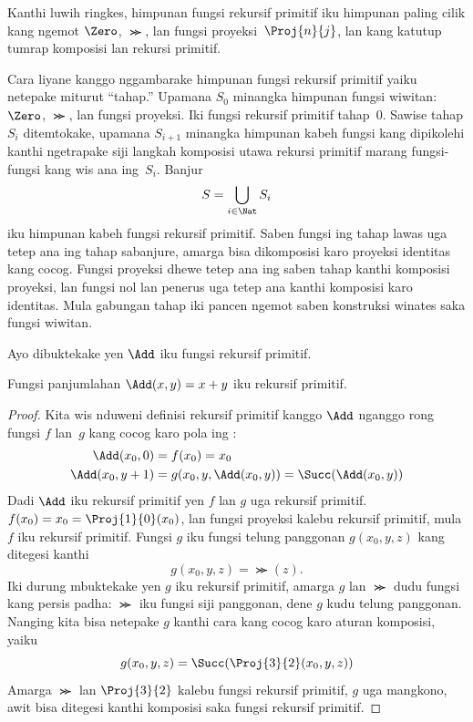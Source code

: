 \documentclass[../../../include/open-logic-section]{subfiles}
\begin{document}
\begin{explain}
Kanthi luwih ringkes, himpunan fungsi rekursif primitif iku
himpunan paling cilik kang ngemot $\Zero$, $\Succ$, lan fungsi
proyeksi~$\Proj{n}{j}$, lan kang katutup tumrap komposisi lan
rekursi primitif.

Cara liyane kanggo nggambarake himpunan fungsi rekursif primitif
yaiku netepake miturut “tahap.” Upamana $S_0$ minangka himpunan
fungsi wiwitan: $\Zero$, $\Succ$, lan fungsi proyeksi. Iki
fungsi rekursif primitif tahap~$0$. Sawise tahap $S_i$ ditemtokake,
upamana $S_{i+1}$ minangka himpunan kabeh fungsi kang dipikolehi
kanthi ngetrapake siji langkah komposisi utawa rekursi primitif
marang fungsi-fungsi kang wis ana ing~$S_i$. Banjur
\[
S = \bigcup_{i \in \Nat} S_i
\]
iku himpunan kabeh fungsi rekursif primitif. Saben fungsi ing tahap lawas uga tetep ana ing tahap sabanjure, amarga bisa dikomposisi karo proyeksi identitas kang cocog. Fungsi proyeksi dhewe tetep ana ing saben tahap kanthi komposisi proyeksi, lan fungsi nol lan penerus uga tetep ana kanthi komposisi karo identitas. Mula gabungan tahap iki pancen ngemot saben konstruksi winates saka fungsi wiwitan.
\end{explain}

Ayo dibuktekake yen $\Add$ iku fungsi rekursif primitif.

\begin{prop}
  Fungsi panjumlahan $\Add(x,y) = x+y$ iku rekursif primitif.
\end{prop}

\begin{proof}
Kita wis nduweni definisi rekursif primitif kanggo $\Add$ nganggo
rong fungsi $f$ lan~$g$ kang cocog karo pola ing
:
\begin{align*}
  \Add(x_0, 0) & = f(x_0) = x_0\\
  \Add(x_0, y+1) & = g(x_0, y, \Add(x_0, y)) =
  \Succ(\Add(x_0, y))
\end{align*}
Dadi $\Add$ iku rekursif primitif yen $f$ lan $g$ uga
rekursif primitif. $f(x_0) = x_0 = \Proj{1}{0}(x_0)$, lan fungsi
proyeksi kalebu rekursif primitif, mula $f$ iku rekursif primitif.
Fungsi $g$ iku fungsi telung panggonan $g(x_0, y, z)$ kang
ditegesi kanthi
\[
g(x_0, y, z) = \Succ(z).
\]
Iki durung mbuktekake yen $g$ iku rekursif primitif, amarga $g$
lan $\Succ$ dudu fungsi kang persis padha: $\Succ$ iku fungsi
siji panggonan, dene $g$ kudu telung panggonan. Nanging kita
bisa netepake $g$ kanthi cara kang cocog karo aturan komposisi,
yaiku
\[
g(x_0, y, z) = \Succ(\Proj{3}{2}(x_0, y, z))
\]
Amarga $\Succ$ lan $\Proj{3}{2}$ kalebu fungsi rekursif
primitif, $g$ uga mangkono, awit bisa ditegesi kanthi komposisi
saka fungsi rekursif primitif.
\end{proof}
\end{document}
